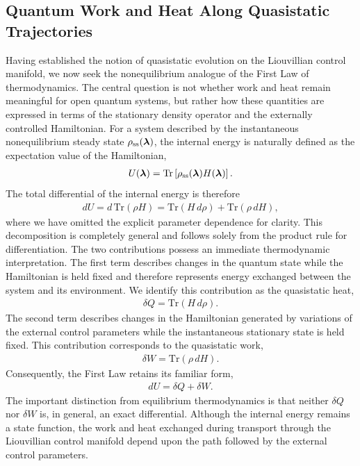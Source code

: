 \subsection{Quantum Work and Heat Along Quasistatic Trajectories}
Having established the notion of quasistatic evolution on the
Liouvillian control manifold, we now seek the nonequilibrium
analogue of the First Law of thermodynamics. The central question
is not whether work and heat remain meaningful for open quantum
systems, but rather how these quantities are expressed in terms
of the stationary density operator and the externally controlled
Hamiltonian.
For a system described by the instantaneous nonequilibrium steady
state \(\rho_{\rm ss}(\bm{\lambda})\), the internal energy is
naturally defined as the expectation value of the Hamiltonian,
\begin{align}
U(\bm{\lambda})
=
\mathrm{Tr}
\left[
\rho_{\rm ss}(\bm{\lambda})
H(\bm{\lambda})
\right].
\end{align}
The total differential of the internal energy is therefore
\begin{align}
dU
=
d\,
\mathrm{Tr}
(\rho H)
=
\mathrm{Tr}
(H\,d\rho)
+
\mathrm{Tr}
(\rho\,dH),
\end{align}
where we have omitted the explicit parameter dependence for
clarity. This decomposition is completely general and follows
solely from the product rule for differentiation.
The two contributions possess an immediate thermodynamic
interpretation. The first term describes changes in the quantum
state while the Hamiltonian is held fixed and therefore
represents energy exchanged between the system and its
environment. We identify this contribution as the quasistatic
heat,
\begin{align}
\delta Q
=
\mathrm{Tr}
(H\,d\rho).
\end{align}
The second term describes changes in the Hamiltonian generated by
variations of the external control parameters while the
instantaneous stationary state is held fixed. This contribution
corresponds to the quasistatic work,
\begin{align}
\delta W
=
\mathrm{Tr}
(\rho\,dH).
\end{align}
Consequently, the First Law retains its familiar form,
\begin{align}
dU
=
\delta Q
+
\delta W.
\end{align}
The important distinction from equilibrium thermodynamics is that
neither \(\delta Q\) nor \(\delta W\) is, in general, an exact
differential. Although the internal energy remains a state
function, the work and heat exchanged during transport through
the Liouvillian control manifold depend upon the path followed by
the external control parameters. 
%
%


